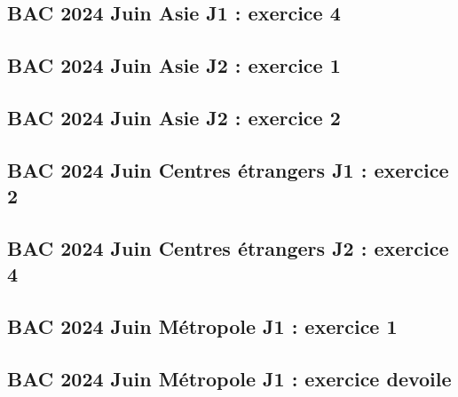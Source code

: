 \documentclass[lang=fr,edition=teacher,layout=sheet]{mxbook}
\begin{document}
\begingroup\endgroup
\par\bigskip
{}\subsection*{BAC 2024 Juin Asie J1 : exercice 4}
\begingroup\endgroup
\par\bigskip
{}\subsection*{BAC 2024 Juin Asie J2 : exercice 1}
\begingroup\endgroup
\par\bigskip
{}\subsection*{BAC 2024 Juin Asie J2 : exercice 2}
\begingroup\endgroup
\par\bigskip
{}\subsection*{BAC 2024 Juin Centres étrangers J1 : exercice 2}
\begingroup\endgroup
\par\bigskip
{}\subsection*{BAC 2024 Juin Centres étrangers J2 : exercice 4}
\begingroup\endgroup
\par\bigskip
{}\subsection*{BAC 2024 Juin Métropole J1 : exercice 1}
\begingroup\endgroup
\par\bigskip
{}\subsection*{BAC 2024 Juin Métropole J1 : exercice devoile}
\end{document}
